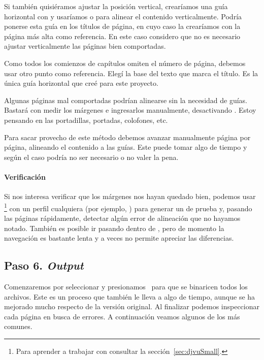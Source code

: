\documentclass[%
	a5paper,
	10pt,
	twoside,
	openright,
	final,
]{memoir}
\begin{document}
{	Si también quisiéramos ajustar la posición vertical, crearíamos una guía horizontal con  y usaríamos \keys{\ctrl + \,\leftclick\,\leftclick} o  para alinear el contenido verticalmente. Podría ponerse esta guía en los títulos de página, en cuyo caso la crearíamos con la página más alta como referencia. En este caso considero que no es necesario ajustar verticalmente las páginas bien comportadas.

	Como todos los comienzos de capítulos omiten el número de página, debemos usar otro punto como referencia. Elegí la base del texto que marca el título. Es la única guía horizontal que creé para este proyecto.

	Algunas páginas mal comportadas podrían alinearse sin la necesidad de guías. Bastará con medir los márgenes e ingresarlos manualmente, desactivando . Estoy pensando en las portadillas, portadas, colofones, etc.

	Para sacar provecho de este método debemos avanzar manualmente página por página, alineando el contenido a las guías. Este puede tomar algo de tiempo y según el caso podría no ser necesario o no valer la pena.

	\paragraph{Verificación} Si nos interesa verificar que los márgenes nos hayan quedado bien, podemos usar \djvusmall\footnote{Para aprender a trabajar con \djvusmall consultar la sección~\ref{sec:djvuSmall}.} con un perfil cualquiera (por ejemplo, ) para generar un \djvu de prueba y, pasando las páginas rápidamente, detectar algún error de alineación que no hayamos notado. También es posible ir pasando dentro de \scantailor, pero de momento la navegación es bastante lenta y a veces no permite apreciar las diferencias.

	\subsection{Paso 6. \emph{Output}\label{sec:SToutput}} Comenzaremos por seleccionar  y presionamos \play\ para que se binaricen todos los archivos. Este es un proceso que también le lleva a \scantailorAdvanced algo de tiempo, aunque se ha mejorado mucho respecto de la versión original. Al finalizar podemos inspeccionar cada página en busca de errores. A continuación veamos algunos de los más comunes.

}
\end{document}
